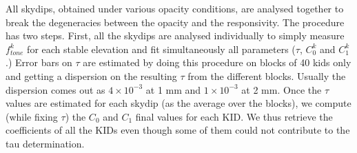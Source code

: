 All skydips, obtained under various opacity
conditions, are analysed together to break the degeneracies between
the opacity and the responsivity. The procedure has two steps.
First, all the skydips are analysed individually to simply measure
$f_{tone}^k$ for each stable elevation and fit simultaneously all 
parameters ($\tau$, $C_0^k$ and $C_1^k$.)
Error bars on $\tau$ are estimated by doing
this procedure on blocks of 40 kids only and getting a dispersion on the
resulting $\tau$ from the different blocks. Usually the dispersion comes out as
$4\times 10^{-3}$ at 1 mm and $1\times 10^{-3}$ at 2 mm. Once the $\tau$ values
are estimated for each skydip (as the average over the blocks), we compute
(while fixing $\tau$) the $C_0$ and $C_1$ final values for each KID. We thus
retrieve the coefficients of all the KIDs even though some of them could not
contribute to the tau determination.



